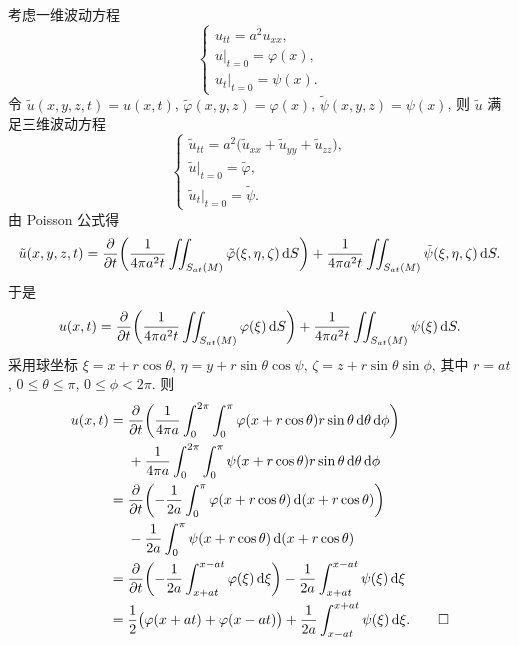 \begin{solve}
  考虑一维波动方程
  \[\begin{cases}
    u_{tt} = a^2 u_{xx}, \\
    u|_{t=0} = \varphi(x), \\
    u_t|_{t=0} = \psi(x).
  \end{cases}\]
  令 $\tilde{u}(x,y,z,t) = u(x,t)$, $\tilde{\varphi}(x,y,z) = \varphi(x)$,
  $\tilde{\psi}(x,y,z) = \psi(x)$, 则 $\tilde{u}$ 满足三维波动方程
  \[\begin{cases}
    \tilde{u}_{tt} = a^2 \bigl(\tilde{u}_{xx} + \tilde{u}_{yy} + \tilde{u}_{zz}\bigr), \\
    \tilde{u}|_{t=0} = \tilde{\varphi}, \\
    \tilde{u}_t|_{t=0} = \tilde{\psi}.
  \end{cases}\]
  由 Poisson 公式得
  \[
    \tilde{u}(x, y, z, t) = \frac{\partial}{\partial t}
      \biggl(\frac{1}{4\pi a^2t} \iint_{S_{at}(M)} \tilde{\varphi}(\xi,\eta,\zeta)\mathop{}\!\mathrm{d} S\biggr)
      + \frac{1}{4\pi a^2t} \iint_{S_{at}(M)} \tilde{\psi}(\xi,\eta,\zeta)\mathop{}\!\mathrm{d} S.
  \]
  于是
  \[
    u(x,t)
    = \frac{\partial}{\partial t}
      \biggl(\frac{1}{4\pi a^2t} \iint_{S_{at}(M)} \varphi(\xi)\mathop{}\!\mathrm{d} S\biggr)
      + \frac{1}{4\pi a^2t} \iint_{S_{at}(M)} \psi(\xi)\mathop{}\!\mathrm{d} S.
  \]
  采用球坐标 $\xi = x + r\cos\theta$, $\eta = y + r\sin\theta\cos\psi$, $\zeta = z + r\sin\theta\sin\phi$, 其中 $r=at$, $0\leq\theta\leq\pi$, $0\leq\phi < 2\pi$. 则
  \begin{align*}
    u(x,t)
    ={} & \frac{\partial}{\partial t}
          \biggl(\frac{1}{4\pi a} \int_0^{2\pi} \int_0^{\pi} \varphi(x+r\cos\theta)
          r\sin\theta \diff\theta\diff\phi\biggr) \\
        & + \frac{1}{4\pi a} \int_0^{2\pi} \int_0^{\pi} \psi(x+r\cos\theta)
          r\sin\theta \diff\theta\diff\phi  \\
    ={} & \frac{\partial}{\partial t}
          \biggl(-\frac{1}{2a} \int_0^{\pi} \varphi(x+r\cos\theta) 
          \diff (x+r\cos\theta)\biggr) \\
        &  - \frac{1}{2a} \int_0^{\pi} \psi(x+r\cos\theta) \diff (x+r\cos\theta) \\
    ={} & \frac{\partial}{\partial t}
          \biggl(-\frac{1}{2a} \int_{x+at}^{x-at} \varphi(\xi) \diff\xi\biggr)
          - \frac{1}{2a} \int_{x+at}^{x-at} \psi(\xi) \diff\xi \\
    ={} & \frac{1}{2}\bigl(\varphi(x+at) + \varphi(x-at)\bigr)
          + \frac{1}{2a}\int_{x-at}^{x+at} \psi(\xi)\diff\xi. \qedhere
  \end{align*}
\end{solve}


